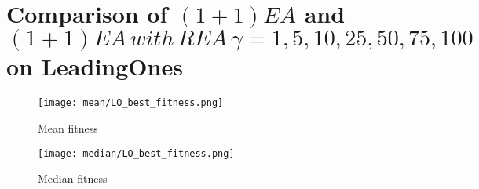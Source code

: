 \documentclass{article}
\begin{document}
\section{Comparison of $(1+1)EA$ and $(1+1)EA\,with\,REA\,\gamma=1,5,10,25,50,75,100$ on LeadingOnes}

\begin{figure}[H]
  \texttt{[image: mean/LO\_best\_fitness.png]}
  \caption{Mean fitness}
\end{figure}
\begin{figure}[H]
  \texttt{[image: median/LO\_best\_fitness.png]}
  \caption{Median fitness}
\end{figure}

%

%
\end{document}
